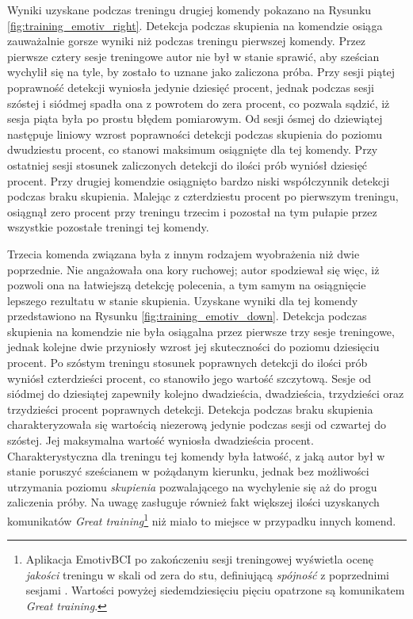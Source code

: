\documentclass[skorowidz,skroty]{dyplomWEZUT}
\begin{document}
Wyniki uzyskane podczas treningu drugiej komendy pokazano na Rysunku \vref{fig:training_emotiv_right}. Detekcja podczas skupienia na komendzie osiąga zauważalnie gorsze wyniki niż podczas treningu pierwszej komendy. Przez pierwsze cztery sesje treningowe autor nie był w stanie sprawić, aby sześcian wychylił się na tyle, by zostało to uznane jako zaliczona próba. Przy sesji piątej poprawność detekcji wyniosła jedynie dziesięć procent, jednak podczas sesji szóstej i siódmej spadła ona z powrotem do zera procent, co pozwala sądzić, iż sesja piąta była po prostu błędem pomiarowym. Od sesji ósmej do dziewiątej następuje liniowy wzrost poprawności detekcji podczas skupienia do poziomu dwudziestu procent, co stanowi maksimum osiągnięte dla tej komendy. Przy ostatniej sesji stosunek zaliczonych detekcji do ilości prób wyniósł dziesięć procent. Przy drugiej komendzie osiągnięto bardzo niski współczynnik detekcji podczas braku skupienia. Malejąc z czterdziestu procent po pierwszym treningu, osiągnął zero procent przy treningu trzecim i pozostał na tym pułapie przez wszystkie pozostałe treningi tej komendy.

Trzecia komenda związana była z innym rodzajem wyobrażenia niż dwie poprzednie. Nie angażowała ona kory ruchowej; autor spodziewał się więc, iż pozwoli ona na łatwiejszą detekcję polecenia, a tym samym na osiągnięcie lepszego rezultatu w stanie skupienia. Uzyskane wyniki dla tej komendy przedstawiono na Rysunku \vref{fig:training_emotiv_down}. Detekcja podczas skupienia na komendzie nie była osiągalna przez pierwsze trzy sesje treningowe, jednak kolejne dwie przyniosły wzrost jej skuteczności do poziomu dziesięciu procent. Po szóstym treningu stosunek poprawnych detekcji do ilości prób wyniósł czterdzieści procent, co stanowiło jego wartość szczytową. Sesje od siódmej do dziesiątej zapewniły kolejno dwadzieścia, dwadzieścia, trzydzieści oraz trzydzieści procent poprawnych detekcji. Detekcja podczas braku skupienia charakteryzowała się wartością niezerową jedynie podczas sesji od czwartej do szóstej. Jej maksymalna wartość wyniosła dwadzieścia procent. Charakterystyczna dla treningu tej komendy była łatwość, z jaką autor był w stanie poruszyć sześcianem w pożądanym kierunku, jednak bez możliwości utrzymania poziomu \textit{skupienia} pozwalającego na wychylenie się aż do progu zaliczenia próby. Na uwagę zasługuje również fakt większej ilości uzyskanych komunikatów \textit{Great training}\footnote{Aplikacja EmotivBCI po zakończeniu sesji treningowej wyświetla ocenę \textit{jakości} treningu w skali od zera do stu, definiującą \textit{spójność} z poprzednimi sesjami \cite{emotivbcidoc}. Wartości powyżej siedemdziesięciu pięciu opatrzone są komunikatem \textit{Great training}.} niż miało to miejsce w przypadku innych komend.
\end{document}
